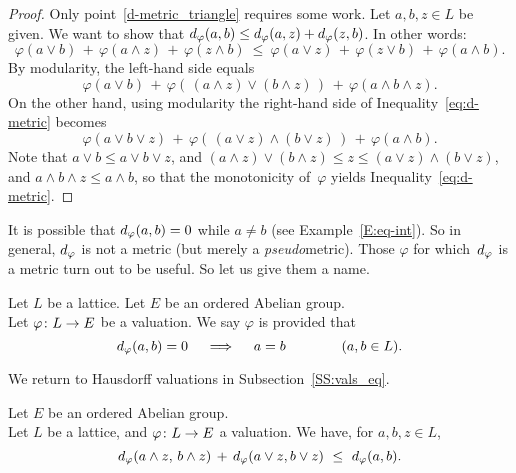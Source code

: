 \documentclass[main.tex]{subfiles}
\begin{document}
\begin{proof}
Only point~\ref{d-metric_triangle} requires some work.
Let $a,b,z\in L$ be given.
We want to show that $d_{\smash{\varphi}}(a,b) \leq d_{\smash{\varphi}}(a,z)+d_{\smash{\varphi}}(z,b)$.
In other words:
\begin{equation}
\label{eq:d-metric}
\varphi(a\vee b) \,+\, \varphi(a\wedge z) \,+\, \varphi (z\wedge b)
\ \leq\ 
\varphi (a\vee z) \,+\, \varphi(z\vee b) \,+\, \varphi (a\wedge b)\text{.}
\end{equation}
By modularity,
the left-hand side equals
\begin{equation*}
\varphi(a\vee b) 
 \,+\, \varphi(\,(a\wedge z)\vee(b\wedge z)\,)
 \,+\, \varphi(a\wedge b\wedge z).
\end{equation*}
On the other hand,
using modularity
the right-hand side of Inequality~\eqref{eq:d-metric} becomes
\begin{equation*}
\varphi(a\vee b\vee z)
 \,+\, \varphi(\,(a\vee z)\wedge(b\vee z)\,)
 \,+\, \varphi(a\wedge b).
\end{equation*}
Note that $a\vee b \leq a\vee b\vee z$,
and $(a\wedge z)\vee (b\wedge z) \leq z \leq (a\vee z)\wedge (b\vee z)$,
and $a\wedge b\wedge z \leq a\wedge b$,
so that the monotonicity of~$\varphi$ yields Inequality~\eqref{eq:d-metric}.
\end{proof}
%
%
\noindent
It is possible that $d_{\smash{\varphi}}(a,b) = 0$ while $a\neq b$
(see Example~\ref{E:eq-int}).
So in general, $d_{\smash{\varphi}}$ is not a metric
(but merely a  \emph{pseudo}metric).
Those $\varphi$ for which~$d_{\smash{\varphi}}$ is a metric
turn out to be useful. So let us give them a name.
\begin{dfn}
\label{D:val_Hausdorff}
Let $L$ be a lattice.
Let $E$ be an ordered Abelian group.\\
Let $\varphi\colon L \rightarrow E$ be a valuation.
We say $\varphi$ is 
provided that
\begin{equation*}
d_{\smash{\varphi}}(a,b) = 0 
\quad \implies \quad a=b \qquad\qquad(a,b\in L).
\end{equation*}
\end{dfn}
\noindent
We return to Hausdorff valuations in Subsection~\ref{SS:vals_eq}.
%
%
\begin{lem}
\label{L:curry-wc-unif}
Let $E$ be an ordered Abelian group.\\
Let $L$ be a lattice,
and $\varphi\colon L \rightarrow E$ a valuation.
We have,
for $a,b,z\in L$,
\begin{equation*}
d_{\smash{\varphi}}(a\wedge z,\,b\wedge z)\,+\,
 d_{\smash{\varphi}}(a\vee z,b\vee z)\ \leq\ d_{\smash{\varphi}}(a,b).
\end{equation*}
\end{lem}
\end{document}

